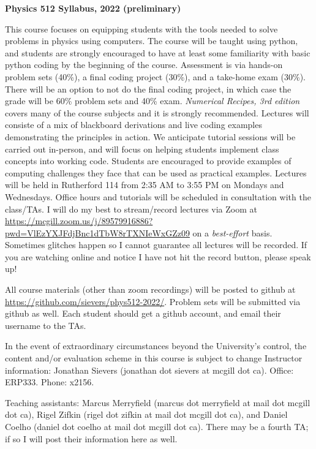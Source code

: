 \documentclass[12]{article}
\begin{document}

\begin{center}{\bf Physics 512 Syllabus, 2022 (preliminary)}
\end{center}
\vskip 0.1in 
This course focuses on equipping students with the tools
needed to solve problems in physics using computers.  The course will
be taught using python, and students are strongly encouraged to have
at least some familiarity with basic python coding by the beginning of
the course.  Assessment is via hands-on problem sets (40\%), a final
coding project (30\%), and a take-home exam (30\%).  There will be an
option to not do the final coding project, in which case the grade
will be 60\% problem sets and 40\% exam.  
{\textit{Numerical Recipes, 3rd edition}} covers many of the course
subjects and it is strongly recommended.  Lectures will consiste of a
mix of blackboard derivations and live coding examples demonstrating
the principles in action.  We anticipate tutorial sessions will be
carried out in-person, and will focus on helping students implement
class concepts into working code.  Students are encouraged to provide
examples of computing challenges they face that can be used as practical examples. 
\vskip 0.1in
\noindent Lectures will be held in Rutherford 114 from 2:35 AM to 3:55
PM on Mondays and Wednesdays. Office hours and tutorials will be
scheduled in consultation with the class/TAs.  I will do my best to
stream/record lectures via Zoom at
\url{https://mcgill.zoom.us/j/89579916886?pwd=VlEzYXJFdjBnc1dTbW8rTXNIeWxGZz09} on a \textit{best-effort}
basis.  Sometimes glitches happen so I cannot guarantee all lectures
will be recorded.  If you are watching online and notice I have not
hit the record button, please speak up!


\noindent All course materials (other than zoom recordings) will be posted to github at
\url{https://github.com/sievers/phys512-2022/}.  Problem sets will be
submitted via github as well.  Each student should get a github account, and
email their username to the TAs.  

\vskip 0.1in
\noindent In the event of extraordinary circumstances beyond the University's
control, the content and/or evaluation scheme in this course is
subject to change
\vskip 0.1in
\noindent
Instructor information:  Jonathan Sievers (jonathan dot sievers at
mcgill dot ca).  Office: ERP333.  Phone: x2156.
\vskip 0.1in

\noindent
Teaching assistants:  Marcus Merryfield (marcus dot merryfield at
mail dot mcgill dot ca), Rigel Zifkin (rigel dot zifkin at mail dot
mcgill dot ca), and Daniel Coelho (daniel dot coelho at mail dot
mcgill dot ca).  There may be a fourth TA; if so I will post their
information here as well.
\end{document}
